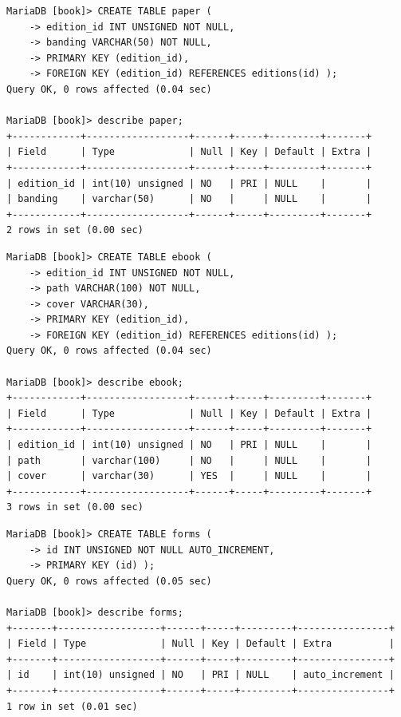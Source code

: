 \documentclass{assignment}
\begin{document}
\begin{verbatim}
MariaDB [book]> CREATE TABLE paper (
    -> edition_id INT UNSIGNED NOT NULL,
    -> banding VARCHAR(50) NOT NULL,
    -> PRIMARY KEY (edition_id),
    -> FOREIGN KEY (edition_id) REFERENCES editions(id) );
Query OK, 0 rows affected (0.04 sec)

MariaDB [book]> describe paper;
+------------+------------------+------+-----+---------+-------+
| Field      | Type             | Null | Key | Default | Extra |
+------------+------------------+------+-----+---------+-------+
| edition_id | int(10) unsigned | NO   | PRI | NULL    |       |
| banding    | varchar(50)      | NO   |     | NULL    |       |
+------------+------------------+------+-----+---------+-------+
2 rows in set (0.00 sec)
\end{verbatim}

\begin{verbatim}
MariaDB [book]> CREATE TABLE ebook (
    -> edition_id INT UNSIGNED NOT NULL,
    -> path VARCHAR(100) NOT NULL,
    -> cover VARCHAR(30),
    -> PRIMARY KEY (edition_id),
    -> FOREIGN KEY (edition_id) REFERENCES editions(id) );
Query OK, 0 rows affected (0.04 sec)

MariaDB [book]> describe ebook;
+------------+------------------+------+-----+---------+-------+
| Field      | Type             | Null | Key | Default | Extra |
+------------+------------------+------+-----+---------+-------+
| edition_id | int(10) unsigned | NO   | PRI | NULL    |       |
| path       | varchar(100)     | NO   |     | NULL    |       |
| cover      | varchar(30)      | YES  |     | NULL    |       |
+------------+------------------+------+-----+---------+-------+
3 rows in set (0.00 sec)
\end{verbatim}

\begin{verbatim}
MariaDB [book]> CREATE TABLE forms (
    -> id INT UNSIGNED NOT NULL AUTO_INCREMENT,
    -> PRIMARY KEY (id) );
Query OK, 0 rows affected (0.05 sec)

MariaDB [book]> describe forms;
+-------+------------------+------+-----+---------+----------------+
| Field | Type             | Null | Key | Default | Extra          |
+-------+------------------+------+-----+---------+----------------+
| id    | int(10) unsigned | NO   | PRI | NULL    | auto_increment |
+-------+------------------+------+-----+---------+----------------+
1 row in set (0.01 sec)

\end{verbatim}
\end{document}
